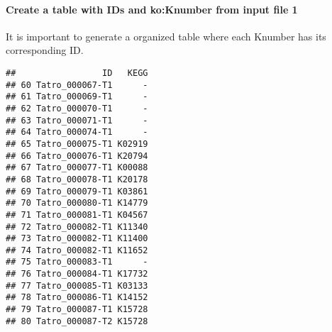 \documentclass[
]{article}
\newenvironment{Shaded}{\begin{snugshade}}{\end{snugshade}}
\newcommand{\AttributeTok}[1]{\textcolor[rgb]{0.77,0.63,0.00}{#1}}
\newcommand{\ControlFlowTok}[1]{\textcolor[rgb]{0.13,0.29,0.53}{\textbf{#1}}}
\newcommand{\DecValTok}[1]{\textcolor[rgb]{0.00,0.00,0.81}{#1}}
\newcommand{\FunctionTok}[1]{\textcolor[rgb]{0.00,0.00,0.00}{#1}}
\newcommand{\NormalTok}[1]{#1}
\newcommand{\OtherTok}[1]{\textcolor[rgb]{0.56,0.35,0.01}{#1}}
\newcommand{\SpecialCharTok}[1]{\textcolor[rgb]{0.00,0.00,0.00}{#1}}
\newcommand{\StringTok}[1]{\textcolor[rgb]{0.31,0.60,0.02}{#1}}
\begin{document}
\hypertarget{create-a-table-with-ids-and-koknumber-from-input-file-1}{%
\paragraph{Create a table with IDs and ko:Knumber from input file
1}\label{create-a-table-with-ids-and-koknumber-from-input-file-1}}

It is important to generate a organized table where each Knumber has its
corresponding ID.

\begin{Shaded}
\end{Shaded}

\begin{verbatim}
##                 ID   KEGG
## 60 Tatro_000067-T1      -
## 61 Tatro_000069-T1      -
## 62 Tatro_000070-T1      -
## 63 Tatro_000071-T1      -
## 64 Tatro_000074-T1      -
## 65 Tatro_000075-T1 K02919
## 66 Tatro_000076-T1 K20794
## 67 Tatro_000077-T1 K00088
## 68 Tatro_000078-T1 K20178
## 69 Tatro_000079-T1 K03861
## 70 Tatro_000080-T1 K14779
## 71 Tatro_000081-T1 K04567
## 72 Tatro_000082-T1 K11340
## 73 Tatro_000082-T1 K11400
## 74 Tatro_000082-T1 K11652
## 75 Tatro_000083-T1      -
## 76 Tatro_000084-T1 K17732
## 77 Tatro_000085-T1 K03133
## 78 Tatro_000086-T1 K14152
## 79 Tatro_000087-T1 K15728
## 80 Tatro_000087-T2 K15728
\end{verbatim}
\end{document}
